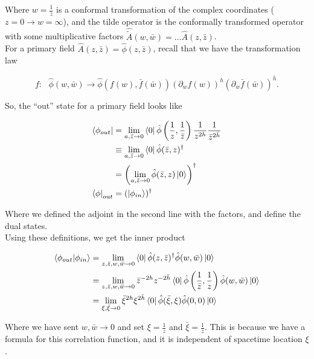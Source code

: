 \noindent Where $w=\frac{1}{z}$ is a conformal transformation of the complex coordinates ($z=0 \rightarrow w=\infty$), and the tilde operator is the conformally transformed operator with some multiplicative factors $\hat{\tilde{A}} (w,\bar{w}) = \dots \hat{A} (z, \bar{z})$. \\

\noindent For a primary field $\hat{A} (z, \bar{z}) = \hat{\phi} (z, \bar{z})$, recall that we have the transformation law

\begin{equation}
f: \,\,\,\, \hat{\phi} (w, \bar{w}) \rightarrow \hat{\phi} (f(w), \bar{f} (\bar{w})) (\partial_w f(w))^h (\partial_{\bar{w}} \bar{f} (\bar{w}))^{\bar{h}}.
\end{equation}

\noindent So, the ``out'' state for a primary field looks like

\begin{align}
\bra{\phi_{out}} &= \lim_{a,\bar{z} \rightarrow 0} \bra{0} \hat{\phi} \left( \frac{1}{z}, \frac{1}{\bar{z}} \right) \frac{1}{z^{2h}} \frac{1}{\bar{z}^{2\bar{h}}} \\
&\equiv \lim_{a,\bar{z} \rightarrow 0} \bra{0} \hat{\phi} (\bar{z}, z)^\dagger \\
&= \left( \lim_{a,\bar{z} \rightarrow 0} \hat{\phi} (\bar{z}, z) \ket{0} \right)^\dagger \\
\bra{\phi}_{out} &= (\ket{\phi_{in}})^\dagger
\end{align}

\noindent Where we defined the adjoint in the second line with the factors, and define the dual states. \\

\noindent Using these definitions, we get the inner product

\begin{align}
\braket{\phi_{out} | \phi_{in}} &= \lim_{z,\bar{z}, w,\bar{w} \rightarrow 0} \bra{0} \hat{\phi} (z, \bar{z})^\dagger \hat{\phi} (w, \bar{w}) \ket{0} \\
&= \lim_{z,\bar{z}, w,\bar{w} \rightarrow 0}  \bar{z}^{-2h} z^{-2\bar{h}} \bra{0} \hat{\phi} \left( \frac{1}{\bar{z}}, \frac{1}{z} \right)  \hat{\phi} (w, \bar{w}) \ket{0} \\
&= \lim_{\xi, \bar{\xi} \rightarrow 0} \bar{\xi}^{2h} \xi^{2\bar{h}} \bra{0} \hat{\phi} (\bar{\xi}, \xi) \hat{\phi} (0,0) \ket{0}
\end{align}

\noindent Where we have sent $w, \bar{w} \rightarrow 0$ and set $\xi = \frac{1}{z}$ and $\bar{\xi} = \frac{1}{\bar{z}}$. This is because we have a formula for this correlation function, and it is independent of spacetime location $\xi$. \\

